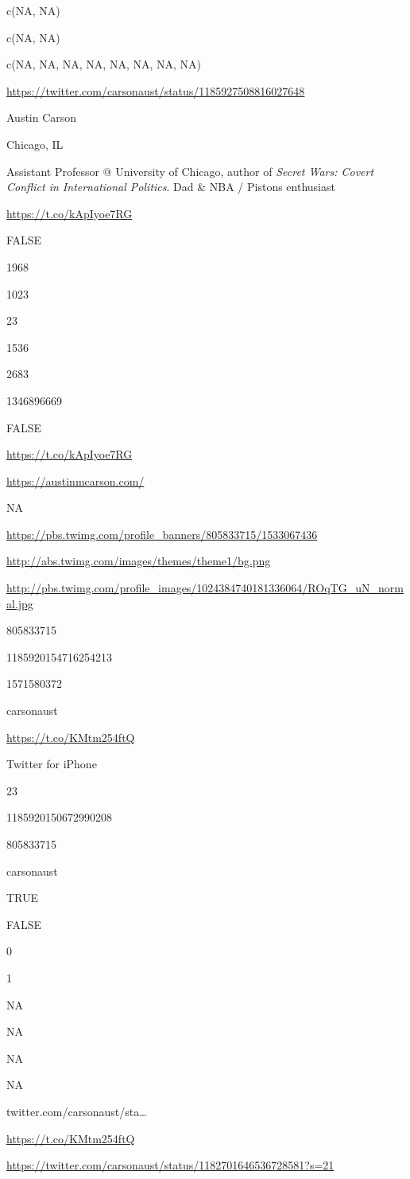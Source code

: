 \documentclass[]{book}
\begin{document}
c(NA, NA)

c(NA, NA)

c(NA, NA, NA, NA, NA, NA, NA, NA)

\url{https://twitter.com/carsonaust/status/1185927508816027648}

Austin Carson

Chicago, IL

Assistant Professor @ University of Chicago, author of \emph{Secret
Wars: Covert Conflict in International Politics}. Dad \& NBA / Pistons
enthusiast

\url{https://t.co/kApIyoe7RG}

FALSE

1968

1023

23

1536

2683

1346896669

FALSE

\url{https://t.co/kApIyoe7RG}

\url{https://austinmcarson.com/}

NA

\url{https://pbs.twimg.com/profile_banners/805833715/1533067436}

\url{http://abs.twimg.com/images/themes/theme1/bg.png}

\url{http://pbs.twimg.com/profile_images/1024384740181336064/ROqTG_uN_normal.jpg}

805833715

1185920154716254213

1571580372

carsonaust

\url{https://t.co/KMtm254ftQ}

Twitter for iPhone

23

1185920150672990208

805833715

carsonaust

TRUE

FALSE

0

1

NA

NA

NA

NA

twitter.com/carsonaust/sta\ldots{}

\url{https://t.co/KMtm254ftQ}

\url{https://twitter.com/carsonaust/status/1182701646536728581?s=21}
\end{document}
